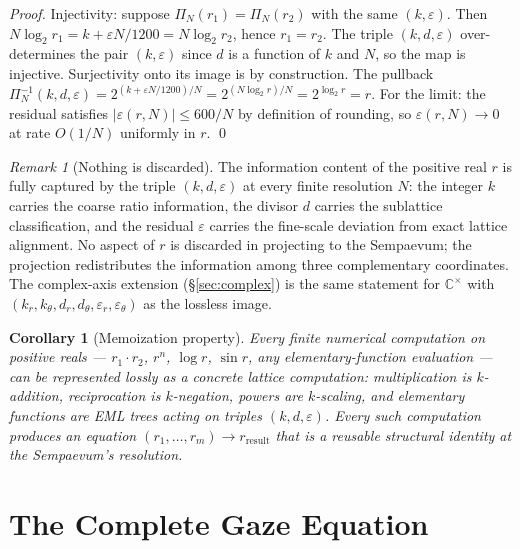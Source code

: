 \documentclass[11pt,a4paper]{article}
\newtheorem{corollary}[theorem]{Corollary}
\theoremstyle{definition}
\theoremstyle{remark}
\newtheorem{remark}[theorem]{Remark}
\newcommand{\C}{\mathbb{C}}
\begin{document}
\begin{proof}
Injectivity: suppose $\Pi_{N}(r_{1})=\Pi_{N}(r_{2})$ with the same $(k,\varepsilon)$. Then $N\log_{2}r_{1} = k + \varepsilon N/1200 = N\log_{2}r_{2}$, hence $r_{1}=r_{2}$. The triple $(k,d,\varepsilon)$ over-determines the pair $(k,\varepsilon)$ since $d$ is a function of $k$ and $N$, so the map is injective. Surjectivity onto its image is by construction. The pullback $\Pi_{N}^{-1}(k,d,\varepsilon) = 2^{(k+\varepsilon N/1200)/N} = 2^{(N\log_{2}r)/N} = 2^{\log_{2}r} = r$. For the limit: the residual satisfies $|\varepsilon(r,N)| \le 600/N$ by definition of rounding, so $\varepsilon(r,N) \to 0$ at rate $O(1/N)$ uniformly in $r$. \qed
\end{proof}

\begin{remark}[Nothing is discarded]
The information content of the positive real $r$ is fully captured by the triple $(k, d, \varepsilon)$ at every finite resolution $N$: the integer $k$ carries the coarse ratio information, the divisor $d$ carries the sublattice classification, and the residual $\varepsilon$ carries the fine-scale deviation from exact lattice alignment. No aspect of $r$ is discarded in projecting to the Sempaevum; the projection redistributes the information among three complementary coordinates. The complex-axis extension (\S\ref{sec:complex}) is the same statement for $\C^{\times}$ with $(k_{r}, k_{\theta}, d_{r}, d_{\theta}, \varepsilon_{r}, \varepsilon_{\theta})$ as the lossless image.
\end{remark}

\begin{corollary}[Memoization property]
Every finite numerical computation on positive reals --- $r_{1}\cdot r_{2}$, $r^{n}$, $\log r$, $\sin r$, any elementary-function evaluation --- can be represented lossly as a concrete lattice computation: multiplication is $k$-addition, reciprocation is $k$-negation, powers are $k$-scaling, and elementary functions are EML trees acting on triples $(k,d,\varepsilon)$. Every such computation produces an equation $(r_{1},\ldots,r_{m})\to r_{\text{result}}$ that is a reusable structural identity at the Sempaevum's resolution.
\end{corollary}

\section{The Complete Gaze Equation}\label{sec:gaze}
\end{document}
